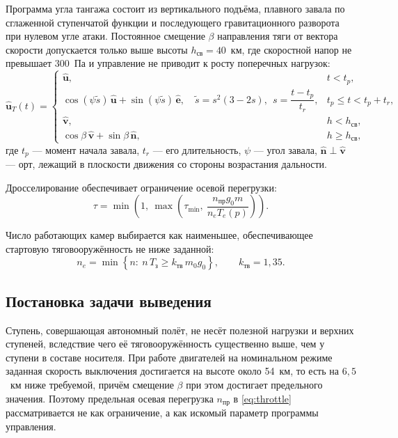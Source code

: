 \documentclass[11pt,a4paper]{article}
\newcommand{\vect}[1]{\bm{#1}}
\begin{document}
Программа угла тангажа состоит из вертикального подъёма, плавного завала по
сглаженной ступенчатой функции и последующего гравитационного разворота при
нулевом угле атаки. Постоянное смещение $\beta$ направления тяги от вектора
скорости допускается только выше высоты $h_{\text{св}}=40$~км, где скоростной
напор не превышает 300~Па и управление не приводит к росту поперечных нагрузок:
\begin{equation}
\hat{\vect{u}}_T(t) =
\begin{cases}
\hat{\vect{u}}, & t<t_p,\\[1ex]
\cos(\psi\tilde s)\,\hat{\vect{u}} + \sin(\psi\tilde s)\,\hat{\vect{e}},
  \quad \tilde s = s^2(3-2s),\ \ s=\dfrac{t-t_p}{t_r}, & t_p \le t < t_p+t_r,\\[2ex]
\hat{\vect{v}}, & h<h_{\text{св}},\\[1ex]
\cos\beta\,\hat{\vect{v}} + \sin\beta\,\hat{\vect{n}}, & h\ge h_{\text{св}},
\end{cases}
\end{equation}
где $t_p$ — момент начала завала, $t_r$ — его длительность, $\psi$ — угол
завала, $\hat{\vect{n}}\perp\hat{\vect{v}}$ — орт, лежащий в плоскости движения
со стороны возрастания дальности.

Дросселирование обеспечивает ограничение осевой перегрузки:
\begin{equation}
\tau = \min\!\left(1,\ \max\!\left(\tau_{\min},\
 \frac{n_{\text{пр}} g_0 m}{n_e T_e(p)}\right)\right).
\label{eq:throttle}
\end{equation}

Число работающих камер выбирается как наименьшее, обеспечивающее стартовую
тяговооружённость не ниже заданной:
\begin{equation}
n_e=\min\left\{n:\ n\,T_{\text{з}}\ge k_{\text{тв}}\,m_0 g_0\right\},
\qquad k_{\text{тв}}=1{,}35 .
\end{equation}

\subsection{Постановка задачи выведения}

Ступень, совершающая автономный полёт, не несёт полезной нагрузки и верхних
ступеней, вследствие чего её тяговооружённость существенно выше, чем у ступени в
составе носителя. При работе двигателей на номинальном режиме заданная скорость
выключения достигается на высоте около 54~км, то есть на $6{,}5$~км ниже
требуемой, причём смещение $\beta$ при этом достигает предельного значения.
Поэтому предельная осевая перегрузка $n_{\text{пр}}$ в \eqref{eq:throttle}
рассматривается не как ограничение, а как искомый параметр программы управления.
\end{document}
